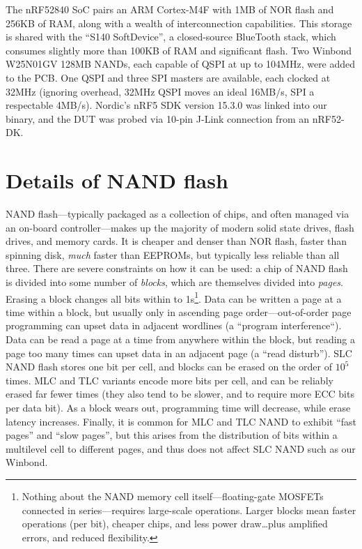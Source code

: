 \documentclass[letterpaper,10pt]{article}
\begin{document}
The nRF52840\parencite{nrf52840} SoC pairs an ARM Cortex-M4F with 1MB of
NOR flash and 256KB of RAM, along with a wealth of interconnection
capabilities. This storage is shared with the ``S140
SoftDevice''\parencite{s140}, a closed-source BlueTooth stack, which consumes
slightly more than 100KB of RAM and significant flash.
Two Winbond W25N01GV\parencite{winbond}
128MB NANDs, each capable of QSPI at up to 104MHz, were added to the PCB.
One QSPI and three SPI masters are available, each clocked at 32MHz (ignoring
overhead, 32MHz QSPI moves an ideal 16MB/s, SPI a respectable 4MB/s). Nordic's nRF5 SDK\parencite{nrf52sdk}
version 15.3.0 was linked into our binary, and the DUT was probed via 10-pin
J-Link\parencite{segger} connection from an nRF52-DK\parencite{nrf52dk}.

\section{Details of NAND flash}

NAND flash---typically packaged as a collection of chips, and often managed via
an on-board controller---makes up the majority of modern solid state drives,
flash drives, and memory cards. It is cheaper and denser than NOR flash,
faster than spinning disk, \textit{much} faster than EEPROMs, but typically
less reliable than all three. There are severe constraints on how it can be
used: a chip of NAND flash is divided into some number of \textit{blocks}, which are
themselves divided into \textit{pages}. Erasing a block changes all bits within to
1s\footnote{Nothing about the NAND memory cell itself---floating-gate MOSFETs
connected in series---requires large-scale operations. Larger blocks mean
faster operations (per bit), cheaper chips, and less power draw\ldots plus
amplified errors, and reduced flexibility.}. Data can be written a page at a
time within a block, but usually only in ascending page order---out-of-order
page programming can upset data in adjacent wordlines (a ``program
interference``\parencite{interference}). Data can be read a page at a time from
anywhere within the block, but reading a page too many times can upset data in
an adjacent page (a ``read disturb''\parencite{readdisturb}). SLC NAND flash stores one bit per cell,
and blocks can be erased on the order of $10^5$ times. MLC and TLC variants
encode more bits per cell, and can be reliably erased far fewer times (they
also tend to be slower, and to require more ECC bits per data bit). As a block
wears out, programming time will decrease, while erase latency
increases\parencite{needtoknow}. Finally, it is common for MLC and TLC NAND to
exhibit ``fast pages'' and ``slow pages'', but this arises from the
distribution of bits within a multilevel cell to different pages, and thus does
not affect SLC NAND\parencite{anomalies} such as our Winbond.
\end{document}
